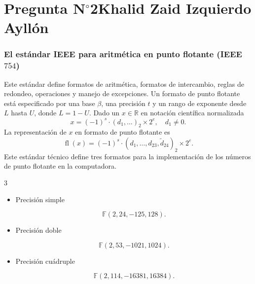 \section{Pregunta N$^{\circ}$2\qquad Khalid Zaid Izquierdo Ayllón}

\begin{frame}
	\frametitle{
		El estándar IEEE para aritmética en punto flotante (IEEE $754$)
	}
	Este estándar define \alert{formatos de aritmética},
	\alert{formatos de intercambio}, \alert{reglas de redondeo},
	\alert{operaciones} y \alert{manejo de excepciones}.
	Un formato de punto flotante está especificado por una \alert{base}
	$\beta$, una \alert{precisión} $t$ y un \alert{rango de exponente}
	desde $L$ hasta $U$, donde $L=1-U$.
	Dado un $x\in\mathbb{R}$ en \alert{notación científica normalizada}
	\begin{equation*}
		x=
		{\left(-1\right)}^{s}\cdot
		{\left(d_{1},\dotsc\right)}_{2}
		\times
		2^{e},\quad
		d_{1}\neq 0.
	\end{equation*}
	La representación de $x$ en formato de punto flotante es
	\begin{equation*}
		\operatorname{fl}\left(x\right)=
		{\left(-1\right)}^{s}\cdot
		{\left(d_{1},\dotsc,d_{23},\widetilde{d}_{24}\right)}_{2}
		\times
		2^{e}.
	\end{equation*}
	Este estándar técnico define tres formatos para la implementación
	de los números de punto flotante en la computadora.
	\begin{multicols}{3}
		\begin{itemize}
			\item Precisión simple

			      \begin{equation*}
				      \mathbb{F}\left(2,24,-125,128\right).
			      \end{equation*}

			\item Precisión doble

			      \begin{equation*}
				      \mathbb{F}\left(2,53,-1021,1024\right).
			      \end{equation*}

			\item Precisión cuádruple

			      \begin{equation*}
				      \mathbb{F}\left(2,114,-16381,16384\right).
			      \end{equation*}
		\end{itemize}
	\end{multicols}
\end{frame}

